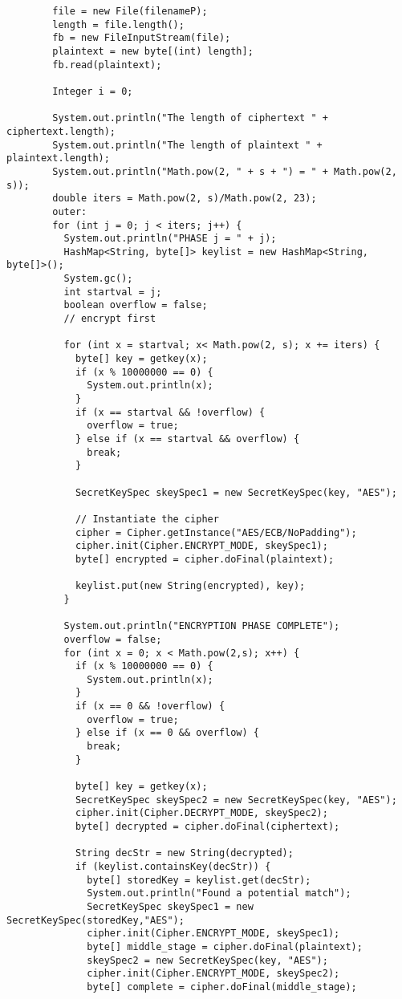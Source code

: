 \documentclass[11pt]{article}
\begin{document}
\begin{verbatim}
		file = new File(filenameP);
		length = file.length();
		fb = new FileInputStream(file);
		plaintext = new byte[(int) length];
		fb.read(plaintext);

		Integer i = 0;

		System.out.println("The length of ciphertext " + ciphertext.length);
		System.out.println("The length of plaintext " + plaintext.length);
		System.out.println("Math.pow(2, " + s + ") = " + Math.pow(2, s));
		double iters = Math.pow(2, s)/Math.pow(2, 23);
		outer:
		for (int j = 0; j < iters; j++) {
		  System.out.println("PHASE j = " + j);
		  HashMap<String, byte[]> keylist = new HashMap<String, byte[]>();
		  System.gc();
		  int startval = j;
		  boolean overflow = false;
		  // encrypt first
			
		  for (int x = startval; x< Math.pow(2, s); x += iters) {
		    byte[] key = getkey(x);
		    if (x % 10000000 == 0) {
		      System.out.println(x);
		    }
		    if (x == startval && !overflow) {
		      overflow = true;
		    } else if (x == startval && overflow) {
		      break;
		    }
		    
		    SecretKeySpec skeySpec1 = new SecretKeySpec(key, "AES");
		    
		    // Instantiate the cipher
		    cipher = Cipher.getInstance("AES/ECB/NoPadding");
		    cipher.init(Cipher.ENCRYPT_MODE, skeySpec1);
		    byte[] encrypted = cipher.doFinal(plaintext);

		    keylist.put(new String(encrypted), key);
		  }

		  System.out.println("ENCRYPTION PHASE COMPLETE");
		  overflow = false;
		  for (int x = 0; x < Math.pow(2,s); x++) {
		    if (x % 10000000 == 0) {
		      System.out.println(x);
		    }
		    if (x == 0 && !overflow) {
		      overflow = true;
		    } else if (x == 0 && overflow) {
		      break;
		    }
		    
		    byte[] key = getkey(x);				
		    SecretKeySpec skeySpec2 = new SecretKeySpec(key, "AES");
		    cipher.init(Cipher.DECRYPT_MODE, skeySpec2);
		    byte[] decrypted = cipher.doFinal(ciphertext);

		    String decStr = new String(decrypted);
		    if (keylist.containsKey(decStr)) {
		      byte[] storedKey = keylist.get(decStr);
		      System.out.println("Found a potential match");
		      SecretKeySpec skeySpec1 = new SecretKeySpec(storedKey,"AES");
		      cipher.init(Cipher.ENCRYPT_MODE, skeySpec1);
		      byte[] middle_stage = cipher.doFinal(plaintext);
		      skeySpec2 = new SecretKeySpec(key, "AES");
		      cipher.init(Cipher.ENCRYPT_MODE, skeySpec2);
		      byte[] complete = cipher.doFinal(middle_stage);


\end{verbatim}
\end{document}
